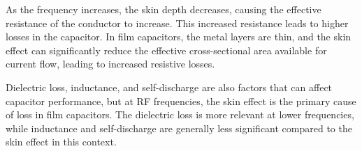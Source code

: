 As the frequency increases, the skin depth decreases, causing the effective resistance of the conductor to increase. This increased resistance leads to higher losses in the capacitor. In film capacitors, the metal layers are thin, and the skin effect can significantly reduce the effective cross-sectional area available for current flow, leading to increased resistive losses.

Dielectric loss, inductance, and self-discharge are also factors that can affect capacitor performance, but at RF frequencies, the skin effect is the primary cause of loss in film capacitors. The dielectric loss is more relevant at lower frequencies, while inductance and self-discharge are generally less significant compared to the skin effect in this context.

